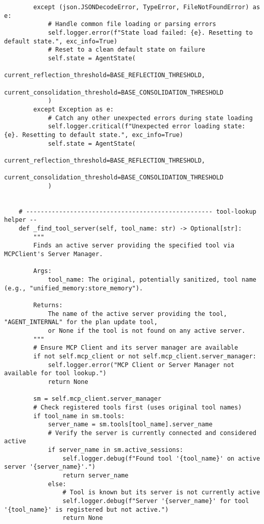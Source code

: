 \documentclass[12pt,a4paper]{article}
\begin{document}
\begin{pageablecode}
\begin{verbatim}
        except (json.JSONDecodeError, TypeError, FileNotFoundError) as e:
            # Handle common file loading or parsing errors
            self.logger.error(f"State load failed: {e}. Resetting to default state.", exc_info=True)
            # Reset to a clean default state on failure
            self.state = AgentState(
                current_reflection_threshold=BASE_REFLECTION_THRESHOLD,
                current_consolidation_threshold=BASE_CONSOLIDATION_THRESHOLD
            )
        except Exception as e:
            # Catch any other unexpected errors during state loading
            self.logger.critical(f"Unexpected error loading state: {e}. Resetting to default state.", exc_info=True)
            self.state = AgentState(
                current_reflection_threshold=BASE_REFLECTION_THRESHOLD,
                current_consolidation_threshold=BASE_CONSOLIDATION_THRESHOLD
            )


    # --------------------------------------------------- tool‑lookup helper --
    def _find_tool_server(self, tool_name: str) -> Optional[str]:
        """
        Finds an active server providing the specified tool via MCPClient's Server Manager.

        Args:
            tool_name: The original, potentially sanitized, tool name (e.g., "unified_memory:store_memory").

        Returns:
            The name of the active server providing the tool, "AGENT_INTERNAL" for the plan update tool,
            or None if the tool is not found on any active server.
        """
        # Ensure MCP Client and its server manager are available
        if not self.mcp_client or not self.mcp_client.server_manager:
            self.logger.error("MCP Client or Server Manager not available for tool lookup.")
            return None

        sm = self.mcp_client.server_manager
        # Check registered tools first (uses original tool names)
        if tool_name in sm.tools:
            server_name = sm.tools[tool_name].server_name
            # Verify the server is currently connected and considered active
            if server_name in sm.active_sessions:
                self.logger.debug(f"Found tool '{tool_name}' on active server '{server_name}'.")
                return server_name
            else:
                # Tool is known but its server is not currently active
                self.logger.debug(f"Server '{server_name}' for tool '{tool_name}' is registered but not active.")
                return None


\end{verbatim}
\end{pageablecode}
\end{document}

